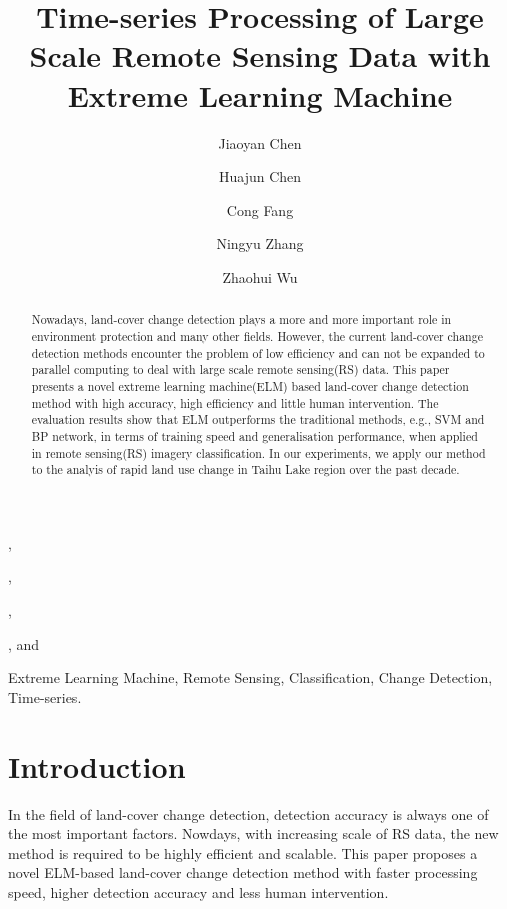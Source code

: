 \documentclass{elsart}
\begin{document}
  

\begin{frontmatter}

\title{Time-series Processing of Large Scale Remote Sensing Data with Extreme Learning Machine}

\author[label1]{Jiaoyan Chen},
\author[label1]{Huajun Chen}
,
\author[label1]{Cong Fang},
\author[label1]{Ningyu Zhang},
and
\author[label1]{Zhaohui Wu}
\address[label1]{College of Computer Science and Technology, Zhejiang University, Hang Zhou, China, 310027}

\begin{abstract}
Nowadays, land-cover change detection plays a more and more important role in environment protection and many other fields.
However, the current land-cover change detection methods encounter the problem of low efficiency and can not be expanded to parallel computing to deal with large scale remote sensing(RS) data.
This paper presents a novel extreme learning machine(ELM) based land-cover change detection method with high accuracy, high efficiency and little human intervention.
The evaluation results show that ELM outperforms the traditional methods, e.g., SVM and BP network, in terms of training speed and generalisation performance, when applied in remote sensing(RS) imagery classification.
In our experiments, we apply our method to the analyis of rapid land use change in Taihu Lake region over the past decade.
\end{abstract}

\begin{keyword}
Extreme Learning Machine, Remote Sensing, Classification, Change Detection, Time-series.
\end{keyword}

\end{frontmatter}



\section{Introduction}
In the field of land-cover change detection, detection accuracy is always one of the most important factors.
Nowdays, with increasing scale of RS data, the new method is required to be highly efficient and scalable. 
This paper proposes a novel ELM-based land-cover change detection method with faster processing speed, higher detection accuracy and less human intervention. 
\end{document}
